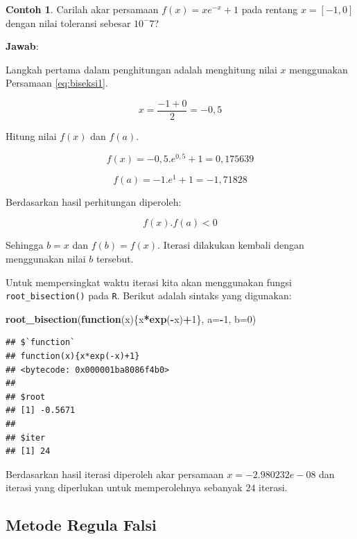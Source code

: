 \documentclass[
]{book}
\newenvironment{Shaded}{\begin{snugshade}}{\end{snugshade}}
\newcommand{\AttributeTok}[1]{\textcolor[rgb]{0.13,0.29,0.53}{#1}}
\newcommand{\ControlFlowTok}[1]{\textcolor[rgb]{0.13,0.29,0.53}{\textbf{#1}}}
\newcommand{\DecValTok}[1]{\textcolor[rgb]{0.00,0.00,0.81}{#1}}
\newcommand{\FunctionTok}[1]{\textcolor[rgb]{0.13,0.29,0.53}{\textbf{#1}}}
\newcommand{\NormalTok}[1]{#1}
\newcommand{\SpecialCharTok}[1]{\textcolor[rgb]{0.81,0.36,0.00}{\textbf{#1}}}
\theoremstyle{definition}
\theoremstyle{definition}
\newtheorem{example}{Contoh}[chapter]
\theoremstyle{definition}
\theoremstyle{definition}
\theoremstyle{remark}
\begin{document}
\begin{example}
\protect\hypertarget{exm:biseksexmp}{}\label{exm:biseksexmp}Carilah akar persamaan \(f\left(x \right)=xe^{-x}+1\) pada rentang \(x=\left[-1,0 \right]\) dengan nilai toleransi sebesar \(10^-7\)?
\end{example}

\textbf{Jawab}:

Langkah pertama dalam penghitungan adalah menghitung nilai \(x\) menggunakan Persamaan \eqref{eq:biseksi1}.

\[
x=\frac{-1+0}{2}=-0,5
\]

Hitung nilai \(f\left(x \right)\) dan \(f\left(a \right)\).

\[
f\left(x \right)=-0,5.e^{0,5}+1=0,175639
\]

\[
f\left(a \right)=-1.e^{1}+1=-1,71828
\]

Berdasarkan hasil perhitungan diperoleh:

\[
f\left(x \right).f\left(a \right)<0
\]

Sehingga \(b=x\) dan \(f\left(b \right)=f\left(x \right)\). Iterasi dilakukan kembali dengan menggunakan nilai \(b\) tersebut.

Untuk mempersingkat waktu iterasi kita akan menggunakan fungsi \texttt{root\_bisection()} pada \texttt{R}. Berikut adalah sintaks yang digunakan:

\begin{Shaded}
\begin{Highlighting}[]
\FunctionTok{root\_bisection}\NormalTok{(}\ControlFlowTok{function}\NormalTok{(x)\{x}\SpecialCharTok{*}\FunctionTok{exp}\NormalTok{(}\SpecialCharTok{{-}}\NormalTok{x)}\SpecialCharTok{+}\DecValTok{1}\NormalTok{\},}
               \AttributeTok{a=}\SpecialCharTok{{-}}\DecValTok{1}\NormalTok{, }\AttributeTok{b=}\DecValTok{0}\NormalTok{)}
\end{Highlighting}
\end{Shaded}

\begin{verbatim}
## $`function`
## function(x){x*exp(-x)+1}
## <bytecode: 0x000001ba8086f4b0>
## 
## $root
## [1] -0.5671
## 
## $iter
## [1] 24
\end{verbatim}

Berdasarkan hasil iterasi diperoleh akar persamaan \(x=-2.980232e-08\) dan iterasi yang diperlukan untuk memperolehnya sebanyak \(24\) iterasi.

\hypertarget{regulafalsi}{%
\subsection{Metode Regula Falsi}\label{regulafalsi}}
\end{document}
